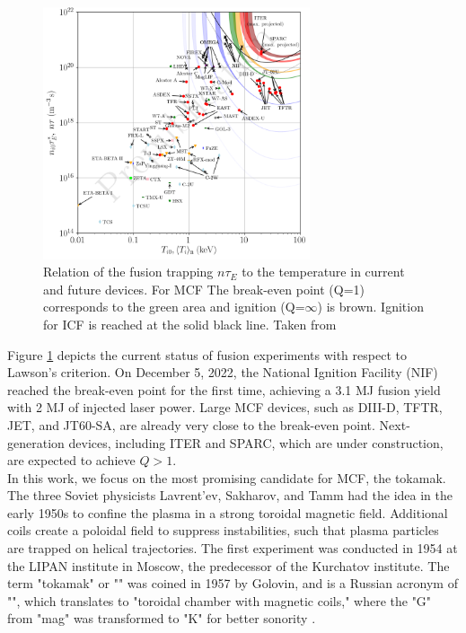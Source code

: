 \begin{figure}[H]
	\centering
	\includegraphics[width=0.7\textwidth]{schemes/Fusion_Triples_2021.png}
	\caption{Relation of the fusion trapping $n\tau_E$ to the temperature in current and future devices. For MCF The break-even point (Q=1) corresponds to the green area and ignition (Q=$\infty$) is brown. Ignition for ICF is reached at the solid black line. Taken from \cite{wurzel2022progress}}
	\label{fig:Intro_fusionTripleProduct}
\end{figure}

Figure \ref{fig:Intro_fusionTripleProduct} depicts the current status of fusion experiments with respect to Lawson's criterion. On December 5, 2022, the National Ignition Facility (NIF) reached the break-even point for the first time, achieving a 3.1 MJ fusion yield with 2 MJ of injected laser power\cite{abu2024achievement}. Large MCF devices, such as DIII-D, TFTR, JET, and JT60-SA, are already very close to the break-even point. Next-generation devices, including ITER and SPARC, which are under construction, are expected to achieve $Q>1$. \\


In this work, we focus on the most promising candidate for MCF, the tokamak. The three Soviet physicists Lavrent'ev, Sakharov, and Tamm had the idea in the early 1950s \cite{azizov2012tokamaks} to confine the plasma in a strong toroidal magnetic field. Additional coils create a poloidal field to suppress instabilities, such that plasma particles are trapped on helical trajectories. The first experiment was conducted in 1954 at the LIPAN institute in Moscow, the predecessor of the Kurchatov institute. The term "tokamak" or "" was coined in 1957 by Golovin, and is a Russian acronym of "", which translates to "toroidal chamber with magnetic coils," where the "G" from "mag" was transformed to "K" for better sonority \cite{shafranov1999trends}. \\

